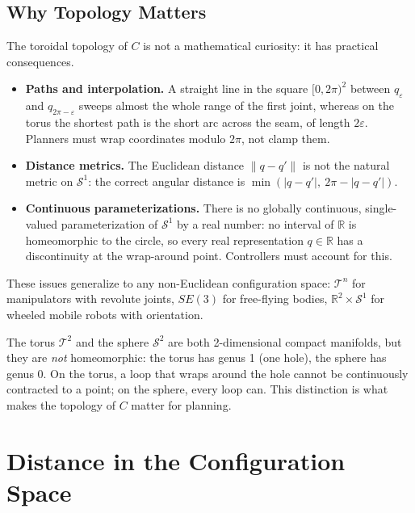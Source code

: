 \subsection{Why Topology Matters}
\label{subsec:cspace-why-topology}

The toroidal topology of \( C \) is not a mathematical
curiosity: it has practical consequences.

\begin{itemize}
    \item \textbf{Paths and interpolation.} A straight line in the square
          \( [0, 2\pi)^2 \) between \( q_\varepsilon \) and
          \( q_{2\pi-\varepsilon} \) sweeps almost the whole range of the
          first joint, whereas on the torus the shortest path is the short
          arc across the seam, of length \( 2\varepsilon \). Planners must
          wrap coordinates modulo \( 2\pi \), not clamp them.
    \item \textbf{Distance metrics.} The Euclidean distance
          \( \|q - q'\| \) is not the natural metric on \( \mathcal{S}^1 \):
          the correct angular distance is
          \( \min(|q - q'|,\ 2\pi - |q - q'|) \).
    \item \textbf{Continuous parameterizations.} There is no globally
          continuous, single-valued parameterization of \( \mathcal{S}^1 \)
          by a real number: no interval of \( \mathbb{R} \) is homeomorphic
          to the circle, so every real representation \( q \in \mathbb{R} \)
          has a discontinuity at the wrap-around point. Controllers must
          account for this.
\end{itemize}

These issues generalize to any non-Euclidean configuration space:
\( \mathcal{T}^n \) for manipulators with revolute joints, \( SE(3) \) for
free-flying bodies, \( \mathbb{R}^2 \times \mathcal{S}^1 \) for wheeled
mobile robots with orientation.

\begin{nb}
The torus \( \mathcal{T}^2 \) and the sphere \( \mathcal{S}^2 \) are both
2-dimensional compact manifolds, but they are \emph{not} homeomorphic: the
torus has genus 1 (one hole), the sphere has genus 0. On the torus, a loop
that wraps around the hole cannot be continuously contracted to a point; on
the sphere, every loop can. This distinction is what makes the topology of
\( C \) matter for planning.
\end{nb}

\section{Distance in the Configuration Space}
\label{sec:cspace-distance}


